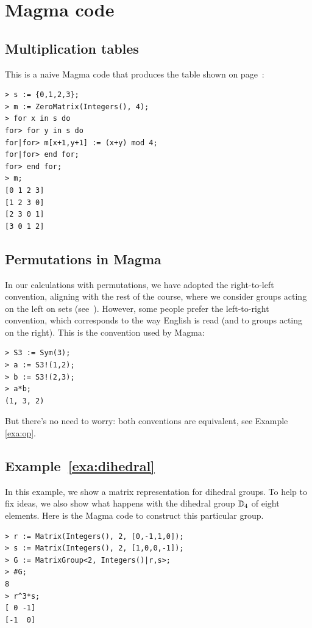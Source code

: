 \section*{Magma code}


\subsection*{Multiplication tables}

This is a naive Magma code that produces the table 
shown on page~\pageref{multiplication_table}:
\begin{lstlisting}
> s := {0,1,2,3};
> m := ZeroMatrix(Integers(), 4);
> for x in s do
for> for y in s do
for|for> m[x+1,y+1] := (x+y) mod 4;
for|for> end for;
for> end for;
> m;
[0 1 2 3]
[1 2 3 0]
[2 3 0 1]
[3 0 1 2]    
\end{lstlisting}


\subsection*{Permutations in Magma}

In our calculations with permutations, we have adopted the right-to-left
convention, aligning with the rest of the course, where we consider groups
acting on the left on sets (see~\pageref{convention:right-to-left}).  However,
some people prefer the left-to-right convention, which corresponds to the way
English is read (and to groups acting on the right). This is the convention
used by Magma:
\begin{lstlisting}
> S3 := Sym(3);
> a := S3!(1,2);
> b := S3!(2,3);
> a*b;
(1, 3, 2)
\end{lstlisting}
But there's no need to worry: both conventions are equivalent, see Example \ref{exa:op}. 

\subsection*{Example~\ref{exa:dihedral}}

In this example, we show a matrix representation 
for dihedral groups. To help to fix ideas, 
we also show what happens with the dihedral group
$\mathbb{D}_4$ of eight elements. Here is the Magma
code to construct this particular group.
\begin{lstlisting}
> r := Matrix(Integers(), 2, [0,-1,1,0]);
> s := Matrix(Integers(), 2, [1,0,0,-1]);
> G := MatrixGroup<2, Integers()|r,s>;
> #G;
8
> r^3*s;
[ 0 -1]
[-1  0]    
\end{lstlisting}


